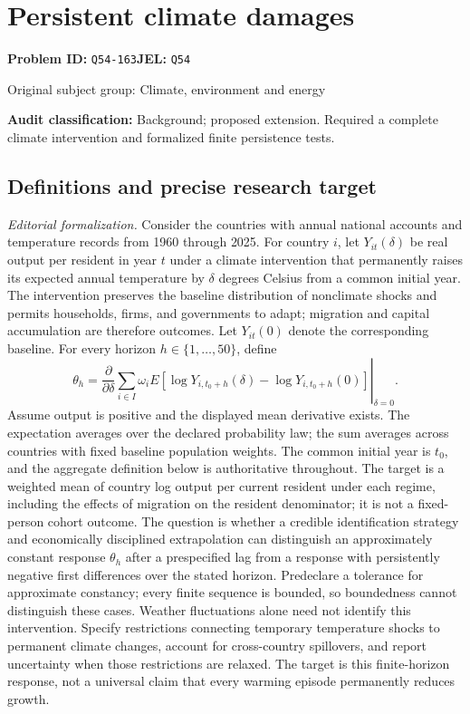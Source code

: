 \documentclass[11pt,a4paper]{article}
\begin{document}
\section*{Persistent climate damages}
\textbf{Problem ID:} \texttt{Q54-163}\quad \textbf{JEL:} \texttt{Q54}\par
\label{problem:OP-0430}
{\sffamily\small\color{muted}Original subject group: Climate, environment and energy\par}
\label{definitions:problem:30007712}
\textbf{Audit classification:} Background; proposed extension. Required a complete climate intervention and formalized finite persistence tests.
\subsection*{Definitions and precise research target}
\textit{Editorial formalization.} Consider the countries with annual national accounts and temperature records from 1960 through 2025. For country \(i\), let \(Y_{it}(\delta)\) be real output per resident in year \(t\) under a climate intervention that permanently raises its expected annual temperature by \(\delta\) degrees Celsius from a common initial year. The intervention preserves the baseline distribution of nonclimate shocks and permits households, firms, and governments to adapt; migration and capital accumulation are therefore outcomes. Let \(Y_{it}(0)\) denote the corresponding baseline. For every horizon \(h\in\{1,\ldots,50\}\), define
\[\theta_h=\left.\frac{\partial}{\partial\delta}\sum_{i\in I}\omega_i E[\log Y_{i,t_0+h}(\delta)-\log Y_{i,t_0+h}(0)]\right|_{\delta=0}.\]
Assume output is positive and the displayed mean derivative exists. The expectation averages over the declared probability law; the sum averages across countries with fixed baseline population weights. The common initial year is \(t_0\), and the aggregate definition below is authoritative throughout. The target is a weighted mean of country log output per current resident under each regime, including the effects of migration on the resident denominator; it is not a fixed-person cohort outcome. The question is whether a credible identification strategy and economically disciplined extrapolation can distinguish an approximately constant response \(\theta_h\) after a prespecified lag from a response with persistently negative first differences over the stated horizon. Predeclare a tolerance for approximate constancy; every finite sequence is bounded, so boundedness cannot distinguish these cases. Weather fluctuations alone need not identify this intervention. Specify restrictions connecting temporary temperature shocks to permanent climate changes, account for cross-country spillovers, and report uncertainty when those restrictions are relaxed. The target is this finite-horizon response, not a universal claim that every warming episode permanently reduces growth.
\end{document}
